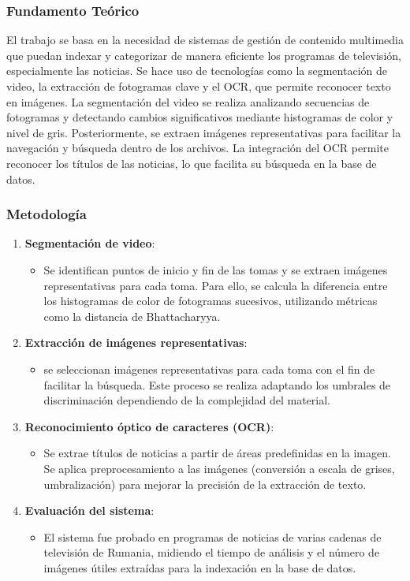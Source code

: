\subsubsection{Fundamento Teórico}

El trabajo se basa en la necesidad de sistemas de gestión de contenido multimedia que puedan indexar y categorizar de manera eficiente los programas de televisión, especialmente las noticias. Se hace uso de tecnologías como la segmentación de video, la extracción de fotogramas clave y el OCR, que permite reconocer texto en imágenes. La segmentación del video se realiza analizando secuencias de fotogramas y detectando cambios significativos mediante histogramas de color y nivel de gris. Posteriormente, se extraen imágenes representativas para facilitar la navegación y búsqueda dentro de los archivos. La integración del OCR permite reconocer los títulos de las noticias, lo que facilita su búsqueda en la base de datos.

\subsubsection {Metodología }
\begin{enumerate}
	\item \textbf{Segmentación de video}:
	\begin{itemize}
		\item Se identifican puntos de inicio y fin de las tomas y se extraen imágenes representativas para cada toma. Para ello, se calcula la diferencia entre los histogramas de color de fotogramas sucesivos, utilizando métricas como la distancia de Bhattacharyya.
	\end{itemize}
	
	\item \textbf{Extracción de imágenes representativas}:
	\begin{itemize}
		\item se seleccionan imágenes representativas para cada toma con el fin de facilitar la búsqueda. Este proceso se realiza adaptando los umbrales de discriminación dependiendo de la complejidad del material.
	\end{itemize}
	
	\item \textbf{Reconocimiento óptico de caracteres (OCR)}:
	\begin{itemize}
		\item Se extrae títulos de noticias a partir de áreas predefinidas en la imagen. Se aplica preprocesamiento a las imágenes (conversión a escala de grises, umbralización) para mejorar la precisión de la extracción de texto.
	\end{itemize}
	
	\item \textbf{Evaluación del sistema}:
	\begin{itemize}
		\item  El sistema fue probado en programas de noticias de varias cadenas de televisión de Rumania, midiendo el tiempo de análisis y el número de imágenes útiles extraídas para la indexación en la base de datos.
	\end{itemize}
\end{enumerate}
	
